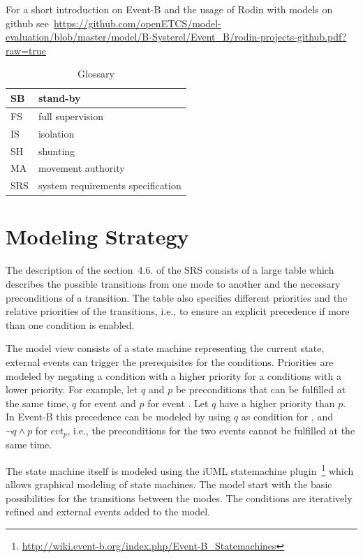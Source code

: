 \documentclass{template/openetcs_article}
\begin{document}
For a short introduction on Event-B and the usage of Rodin with models on github
see~\url{https://github.com/openETCS/model-evaluation/blob/master/model/B-Systerel/Event_B/rodin-projects-github.pdf?raw=true}

\begin{table}[ht]
  \centering
  \begin{tabular}[ht]{|l|l|}
    \hline
    SB & stand-by \\
    \hline
    FS & full supervision \\
    \hline
    IS & isolation \\
    \hline
    SH & shunting \\
    \hline
    MA & movement authority \\
    \hline
    SRS & system requirements specification \\
    \hline
  \end{tabular}
  \caption{Glossary}
  \label{tab:glossary}
\end{table}


\section{Modeling Strategy}
\label{sec:modeling-strategy}

The description of the section~4.6. of the SRS consists of a large table which
describes the possible transitions from one mode to another and the necessary
preconditions of a transition. The table also specifies different priorities and
the relative priorities of the transitions, i.e., to ensure an explicit
precedence if more than one condition is enabled.

The model view consists of a state machine representing the current state,
external events can trigger the prerequisites for the conditions. Priorities are
modeled by negating a condition with a higher priority for a conditions with a
lower priority. For example, let $q$ and $p$ be preconditions that can be
fulfilled at the same time, $q$ for event  and $p$ for event
. Let $q$ have a higher priority than $p$. In Event-B this
precedence can be modeled by using $q$ as condition for , and
$\neg q \wedge p$ for $evt_p$, i.e., the preconditions for the two events cannot
be fulfilled at the same time.

The state machine itself is modeled using the iUML statemachine
plugin~\footnote{\url{http://wiki.event-b.org/index.php/Event-B_Statemachines}}
which allows graphical modeling of state machines. The model start with the
basic possibilities for the transitions between the modes. The conditions are
iteratively refined and external events added to the model.
\end{document}

